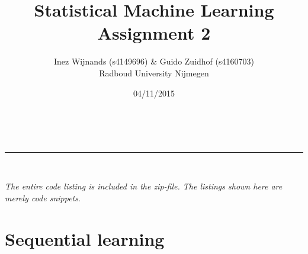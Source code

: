 \documentclass[a4paper,10pt]{article}
\makeatletter
\numberwithin{equation}{section} %
\numberwithin{figure}{section} %
\numberwithin{table}{section} %
\newcommand{\linia}{\rule{\linewidth}{0.5pt}}
\theoremstyle{mytheor}
\renewcommand{\maketitle}{
\begin{center}
\vspace{2ex}
{\huge \textsc{\@title}}
\vspace{1ex}
\\
\linia\\
\@author  \@date
\vspace{4ex}
\end{center}
}
\makeatother
\begin{document}
\title{Statistical Machine Learning \\ Assignment 2}

\author{Inez Wijnands (s4149696) \& Guido Zuidhof (s4160703)\\ Radboud University Nijmegen\\}

\date{04/11/2015}

\maketitle

\noindent \textit{The entire code listing is included in the zip-file. The listings shown here are merely code snippets}.\vspace{-0.5cm}
\section{Sequential learning}
\end{document}
